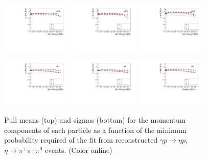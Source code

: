 \begin{figure}[tbp]
\begin{center}
\includegraphics[width=0.3\textwidth]{figures/gluex_nim_pullspx_pulls_sigma_data.pdf}
\includegraphics[width=0.3\textwidth]{figures/gluex_nim_pullspy_pulls_sigma_data.pdf}
\includegraphics[width=0.3\textwidth]{figures/gluex_nim_pullspz_pulls_sigma_data.pdf}

\includegraphics[width=0.3\textwidth]{figures/gluex_nim_pullspx_pulls_sigma_mc.pdf}
\includegraphics[width=0.3\textwidth]{figures/gluex_nim_pullspy_pulls_sigma_mc.pdf}
\includegraphics[width=0.3\textwidth]{figures/gluex_nim_pullspz_pulls_sigma_mc.pdf}

\caption{\label{fig:kinfitstudy}
Pull means (top) and sigmas (bottom) for the momentum components of each particle as a function of the minimum probability required of the fit from reconstructed $\gamma p \to \eta p$,  $\eta \to \pi^+\pi^-\pi^0$ events.
 (Color online)}
\end{center}
\end{figure}

